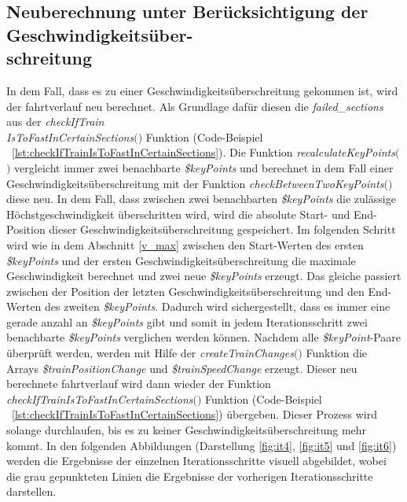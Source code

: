 \subsection{Neuberechnung unter Berücksichtigung der Geschwindigkeitsüber-\\schreitung}  \label{neuberechnung}
In dem Fall, dass es zu einer Geschwindigkeitsüberschreitung gekommen ist, wird der \Gls{fahrtverlauf} neu berechnet. Als Grundlage dafür diesen die \textit{\grqq{}failed\_sections\grqq{}} aus der \textit{check\-If\-Train\\Is\-To\-Fast\-In\-Certain\-Sections$($$)$} Funktion (Code-Beispiel ~\ref{lst:checkIfTrainIsToFastInCertainSections}). Die Funktion \textit{recalculate\-Key\-Points$($$)$} vergleicht immer zwei benachbarte \textit{\$keyPoints} und berechnet in dem Fall einer Geschwindigkeitsüberschreitung mit der Funktion \textit{checkBetweenTwoKeyPoints$($$)$} diese neu. In dem Fall, dass zwischen zwei benachbarten \textit{\$keyPoints} die zulässige Höchstgeschwindigkeit überschritten wird, wird die absolute Start- und End-Position dieser Geschwindigkeitsüberschreitung gespeichert. Im folgenden Schritt wird wie in dem Abschnitt \ref{v_max} zwischen den Start-Werten des ersten \textit{\$keyPoints} und der ersten Geschwindigkeitsüberschreitung die maximale Geschwindigkeit berechnet und zwei neue \textit{\$keyPoints} erzeugt. Das gleiche passiert zwischen der Position der letzten Geschwindigkeitsüberschreitung und den End-Werten des zweiten \textit{\$keyPoints}. Dadurch wird sichergestellt, dass es immer eine gerade anzahl an \textit{\$keyPoints} gibt und somit in jedem Iterationsschritt zwei benachbarte \textit{\$keyPoints} verglichen werden können. Nachdem alle \textit{\$keyPoint}-Paare überprüft werden, werden mit Hilfe der \textit{createTrainChanges$($$)$} Funktion die Arrays \textit{\$trainPositionChange} und \textit{\$trainSpeedChange} erzeugt. Dieser neu berechnete \Gls{fahrtverlauf} wird dann wieder der Funktion \textit{check\-If\-Train\-Is\-To\-Fast\-In\-Certain\-Sections$($$)$} Funktion (Code-Beispiel ~\ref{lst:checkIfTrainIsToFastInCertainSections}) übergeben. Dieser Prozess wird solange durchlaufen, bis es zu keiner Geschwindigkeitsüberschreitung mehr kommt. In den folgenden Abbildungen (Darstellung \ref{fig:it4}, \ref{fig:it5} und \ref{fig:it6}) werden die Ergebnisse der einzelnen Iterationsschritte visuell abgebildet, wobei die grau gepunkteten Linien die Ergebnisse der vorherigen Iterationsschritte darstellen.
